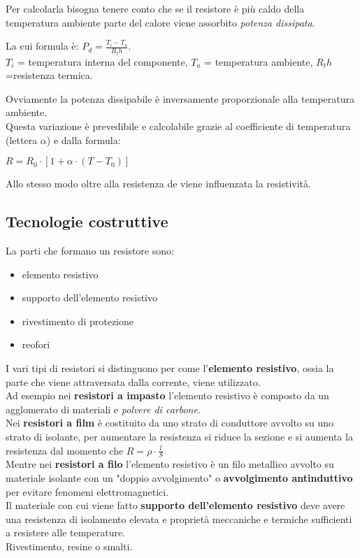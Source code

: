 \documentclass{article}
\begin{document}
Per calcolarla bisogna tenere conto che se il resistore è più caldo della temperatura ambiente parte del calore viene assorbito \textit{potenza dissipata}.
\begin{center}
    La cui formula è: $P_d=\frac{T_i-T_a}{R_th}$.\\
$T_i$ = temperatura interna del componente, $T_a$ = temperatura ambiente, $R_th$=resistenza termica.
\end{center}
Ovviamente la potenza dissipabile è inversamente proporzionale alla temperatura ambiente.\\
Questa variazione è prevedibile e calcolabile grazie al coefficiente di temperatura (lettera $\alpha$) e dalla formula:
\begin{center}
    $R=R_0\cdot[1+\alpha\cdot(T-T_0)]$
\end{center}
Allo stesso modo oltre alla resistenza de viene influenzata la resistività.\\
\subsection{Tecnologie costruttive}
La parti che formano un resistore sono:
\begin{itemize}
    \item elemento resistivo
    \item supporto dell'elemento resistivo
    \item rivestimento di protezione
    \item reofori
\end{itemize}
I vari tipi di resistori si distinguono per come l'\textbf{elemento resistivo}, ossia la parte che viene attraversata dalla corrente, viene utilizzato.\\
Ad esempio nei \textbf{resistori a impasto} l'elemento resistivo è composto da un agglomerato di materiali e \emph{polvere di carbone}.\\
Nei \textbf{resistori a film} è costituito da uno strato di conduttore avvolto su uno strato di isolante, per aumentare la resistenza si riduce la sezione e si aumenta la resistenza dal momento che $R=\rho\cdot\frac{l}{S}$\\
Mentre nei\textbf{ resistori a filo} l'elemento resistivo è un filo metallico avvolto su materiale isolante con un "doppio avvolgimento" o \textbf{avvolgimento antinduttivo} per evitare fenomeni elettromagnetici.\\
Il materiale con cui viene fatto \textbf{supporto dell'elemento resistivo} deve avere una resistenza di isolamento elevata e proprietà meccaniche e termiche sufficienti a resistere alle temperature.\\
Rivestimento, resine o smalti.
\end{document}
